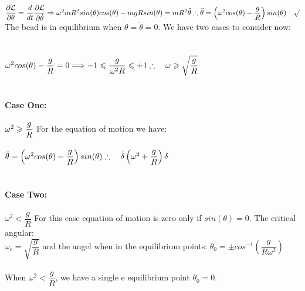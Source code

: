 \documentclass[fleqn]{article}
\begin{document}
\begin{enumerate}
{        \\
        $
          \dfrac{\partial \mathcal{L}}{\partial \theta}=\dfrac{d}{dt} \dfrac{\partial \mathcal{L}}{\partial \dot{\theta}} \Rightarrow \omega^2 m R^2 sin(\theta) cos(\theta)-mgR sin(\theta)=mR^2 \ddot{\theta} \\
          \\
          \therefore \ddot{\theta}=\left(\omega^2 cos(\theta)-\dfrac{g}{R}\right)sin(\theta) ~~~ \surd \\
          \\
          \\
        $
        The bead is in equilibrium when $\dot{\theta}=\ddot{\theta}=0$. We have two cases to consider now: \\
        \\
        \\
        $
          \omega^2 cos(\theta)-\dfrac{g}{R}=0 \Longrightarrow -1\leqslant \dfrac{g}{\omega^2 R} \leqslant +1 \\
          \\
          \\
          \therefore ~~~ \omega \geqslant \sqrt{\dfrac{g}{R}} \\
          \\
          \\
        $
        \\
        \\
        \\
        \textbf{Case One:} \\
        \\
        $
          \omega^2 \geqslant \dfrac{g}{R} \\
          \\ 
        $
        For the equation of motion we have: \\
        \\
        $
          \ddot{\theta}=\left(\omega^2 cos(\theta)-\dfrac{g}{R}\right) sin(\theta) \\
          \\
          \therefore ~~~ \dot{\delta}\left(\omega^2+\dfrac{g}{R}\right) \delta
        $
        \\
        \\
        \\
        \textbf{Case Two:} \\
        \\
        $
          \omega^2 < \dfrac{g}{R}
        $
        For this case equation of motion is zero only if $sin(\theta)=0$. The critical angular: \\
        $
          \omega_c=\sqrt{\dfrac{g}{R}}
        $ and the angel when in the equilibrium points: $\theta_0=\pm cos^{-1} \left(\dfrac{g}{R \omega^2}\right)$ \\ \\
        When $\omega^2<\dfrac{g}{R}$, we have a single e equilibrium point $\theta_0=0$.
      }

  \end{enumerate}
\end{document}
